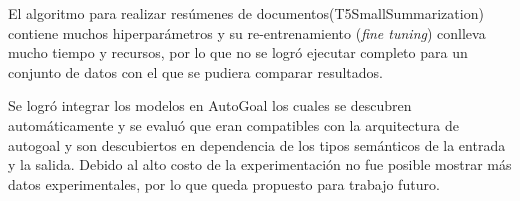 El algoritmo para realizar resúmenes de documentos(T5SmallSummarization) contiene muchos hiperparámetros y su re-entrenamiento (\textit{fine tuning}) conlleva mucho tiempo y recursos, por lo que no se logró ejecutar completo para un conjunto de datos con el que se pudiera comparar resultados.

Se logró integrar los modelos en AutoGoal los cuales se descubren automáticamente y se evaluó que eran compatibles con la arquitectura de autogoal y son descubiertos en dependencia de los tipos semánticos de la entrada y la salida. Debido al alto costo de la experimentación no fue posible mostrar más datos experimentales, por lo que queda propuesto para trabajo futuro.
